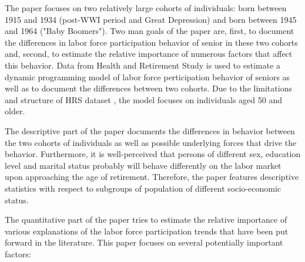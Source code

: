 \documentclass[
10pt, %
a4paper, %
oneside, %
headinclude,footinclude, %
BCOR5mm, %
]{scrartcl}
\begin{document}
The paper focuses on two relatively large cohorts of individuals: born between 1915 and 1934 (post-WWI period and Great Depression) and born between 1945 and 1964 ("Baby Boomers"). Two man goals of the paper are, first, to document the differences in labor force participation behavior of senior in these two cohorts and, second, to estimate the relative importance of numerous factors that affect this behavior. Data from Health and Retirement Study is used to estimate a dynamic programming model of labor force perticipation behavior of seniors as well as to document the differences between two cohorts. Due to the limitations and structure of HRS dataset , the model focuses on individuals aged 50 and older.

The descriptive part of the paper documents the differences in behavior between the two cohorts of individuals as well as possible underlying forces that drive the behavior. Furthermore, it is well-perceived that persons of different sex, education level and marital status probably will behave differently on the labor market upon approaching the age of retirement. Therefore, the paper features descriptive statistics with respect to subgroups of population of different socio-economic status.

The quantitative part of the paper tries to estimate the relative importance of various explanations of the labor force participation trends that have been put forward in the literature. This paper focuses on several potentially important factors:
\end{document}
